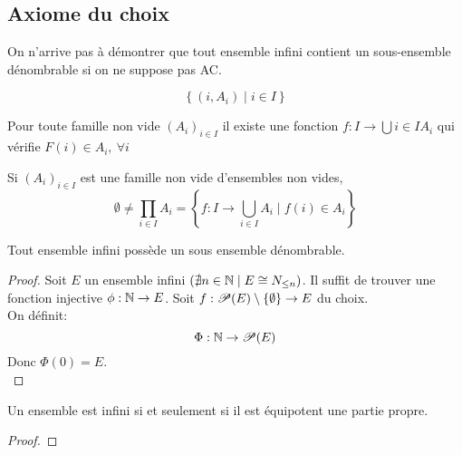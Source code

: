 \subsection{Axiome du choix}

On n'arrive pas à démontrer que tout ensemble infini contient un sous-ensemble dénombrable si on ne suppose pas AC.


\begin{definition}[Famille]
	$$ \left\{ (i, A_i) \mid i \in I \right\} $$

\end{definition}

\begin{axiom}
	Pour toute famille non vide $(A_i)_{i \in I}$ il existe une fonction
	$f : I \to \bigcup{i \in I} A_i$ qui vérifie $F(i) \in A_i, \ \forall i$
\end{axiom}

\begin{axiom}
	Si $(A_i)_{i \in I}$ est une famille non vide d'ensembles non vides,
	$$ \emptyset \neq \prod_{i \in I} A_i = \left\{ f: I \to \bigcup\limits_{i \in I} A_i  \mid f(i) \in A_i \right\} $$
\end{axiom}

\begin{theorem}
	Tout ensemble infini possède un sous ensemble dénombrable.
\end{theorem}

\begin{proof}
	Soit $E$ un ensemble infini $(\nexists n \in \mathbb{N} \mid E \cong N_{\leq n})$. Il suffit de trouver une fonction injective
	$\phi : \mathbb{N} \to E$. Soit $f: \mathscr{P}(E)\setminus\{\emptyset\} \to E$ du choix.\\
	On définit:
	$$ \Phi : \mathbb{N} \to \mathscr{P}(E) $$
	Donc $ \Phi (0) = E$.\\
\end{proof}




\begin{prop}
	Un ensemble est infini si et seulement si il est équipotent  une partie propre.
\end{prop}

\begin{proof}
\end{proof}



